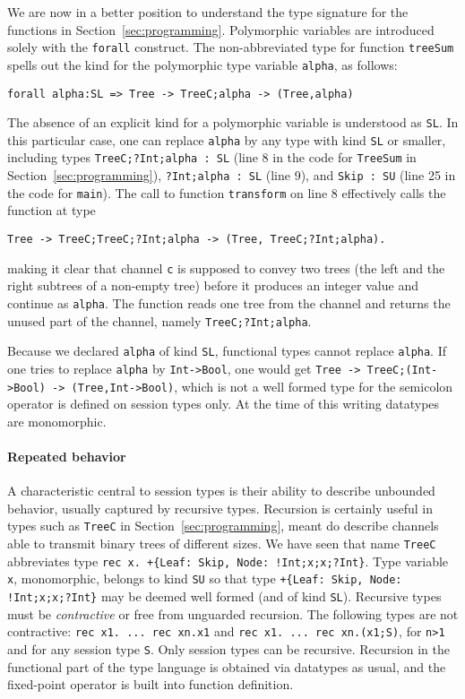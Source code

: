 We are now in a better position to understand the type signature for
the functions in Section~\ref{sec:programming}.  Polymorphic variables
are introduced solely with the \lstinline|forall| construct. The
non-abbreviated type for function \lstinline|treeSum| spells out the
kind for the polymorphic type variable \lstinline|alpha|, as follows:
%
\begin{lstlisting}
forall alpha:SL => Tree -> TreeC;alpha -> (Tree,alpha)
\end{lstlisting}
%
The absence of an explicit kind for a polymorphic variable is
understood as \lstinline|SL|. In this particular case, one can replace
\lstinline|alpha| by any type with kind \lstinline|SL| or smaller,
including types \lstinline|TreeC;?Int;alpha : SL| (line 8 in the code
for \lstinline|TreeSum| in Section~\ref{sec:programming}),
\lstinline|?Int;alpha : SL| (line 9), and \lstinline|Skip : SU| (line
25 in the code for \lstinline|main|).
%
The call to function \lstinline|transform| on line
8 effectively calls the function at type
%
\begin{lstlisting}
Tree -> TreeC;TreeC;?Int;alpha -> (Tree, TreeC;?Int;alpha).
\end{lstlisting}
%
making it clear that channel \lstinline|c| is supposed to convey two
trees (the left and the right subtrees of a non-empty tree) before it
produces an integer value and continue as \lstinline|alpha|. The
function reads one tree from the channel and returns the unused part
of the channel, namely \lstinline|TreeC;?Int;alpha|.

Because we declared \lstinline|alpha| of kind \lstinline|SL|,
functional types cannot replace \lstinline|alpha|.  If one tries to
replace \lstinline|alpha| by \lstinline|Int->Bool|, one would get
%
\lstinline|Tree -> TreeC;(Int->Bool) -> (Tree,Int->Bool)|, which is
not a well formed type for the semicolon operator is defined on
session types only.
%
At the time of this writing datatypes are monomorphic.

\paragraph{Repeated behavior}

A characteristic central to session types is their ability to describe
unbounded behavior, usually captured by recursive types. Recursion is
certainly useful in types such as \lstinline|TreeC| in
Section~\ref{sec:programming}, meant do describe channels able to
transmit binary trees of different sizes. We have seen that name
\lstinline|TreeC| abbreviates type
%
\lstinline|rec x. +{Leaf: Skip, Node: !Int;x;x;?Int}|.  Type variable
\lstinline|x|, monomorphic, belongs to kind \lstinline|SU| so that
type
%
\lstinline|+{Leaf: Skip, Node: !Int;x;x;?Int}| may be deemed well
formed (and of kind \lstinline|SL|).
%
Recursive types must be \emph{contractive} or free from unguarded
recursion. The following types are not contractive:
%
\lstinline|rec x1. ... rec xn.x1| and
%
\lstinline|rec x1. ... rec xn.(x1;S)|, for \lstinline|n>1| and for any
session type \lstinline|S|.
%
Only session types can be recursive. Recursion in the functional part
of the type language is obtained via datatypes as usual, and the
fixed-point operator is built into function definition.

